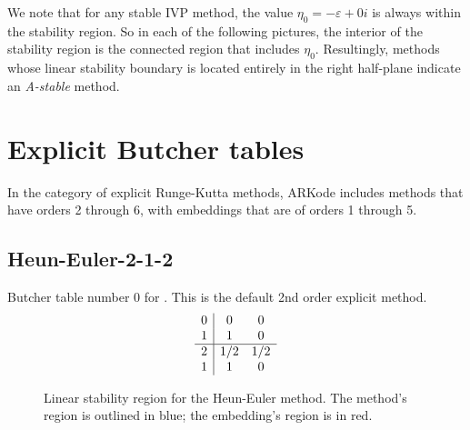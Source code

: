 \documentclass[letterpaper,10pt,english]{sphinxmanual}
\begin{document}
We note that for any stable IVP method, the value \(\eta_0 =
-\varepsilon + 0i\) is always within the stability region.  So in each
of the following pictures, the interior of the stability region is the
connected region that includes \(\eta_0\).  Resultingly, methods
whose linear stability boundary is located entirely in the right
half-plane indicate an \emph{A-stable} method.


\section{Explicit Butcher tables}
\label{Butcher:explicit-butcher-tables}\label{Butcher:butcher-explicit}
In the category of explicit Runge-Kutta methods, ARKode includes
methods that have orders 2 through 6, with embeddings that are of
orders 1 through 5.


\subsection{Heun-Euler-2-1-2}
\label{Butcher:butcher-heun-euler}\label{Butcher:heun-euler-2-1-2}
Butcher table number 0
for {\hyperref[c_interface/User_callable:c.ARKodeSetERKTableNum]{\emph{}}}.  This is
the default 2nd order explicit method.
\begin{gather}
\begin{split}\begin{array}{r|cc}
  0 & 0 & 0 \\
  1 & 1 & 0 \\
  \hline
  2 & 1/2 & 1/2 \\
  1 & 1 & 0
\end{array}\end{split}\notag
\end{gather}\begin{figure}[htbp]
\centering
\capstart

\caption{Linear stability region for the Heun-Euler method.  The method's
region is outlined in blue; the embedding's region is in red.}\end{figure}
\end{document}
